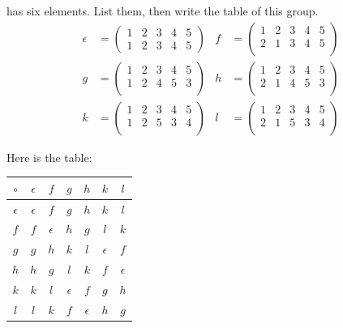\documentclass[twoside]{amsart}
\begin{document}
\begin{enumerate}[A.]
\begin{enumerate}[1]
      has six elements. List them, then write the table of this group.
      \begin{align*}
         \epsilon & = \begin{pmatrix}
	                 1 & 2 & 3 & 4 & 5 \\
			 1 & 2 & 3 & 4 & 5
		      \end{pmatrix}
		      &
         f & = \begin{pmatrix}
	          1 & 2 & 3 & 4 & 5 \\
		  2 & 1 & 3 & 4 & 5 \\
	       \end{pmatrix} \\
	 g & = \begin{pmatrix}
	          1 & 2 & 3 & 4 & 5 \\
		  1 & 2 & 4 & 5 & 3 \\
	       \end{pmatrix}
	       &
	 h & = \begin{pmatrix}
	          1 & 2 & 3 & 4 & 5 \\
		  2 & 1 & 4 & 5 & 3 \\
	       \end{pmatrix} \\
	 k & = \begin{pmatrix}
	          1 & 2 & 3 & 4 & 5 \\
		  1 & 2 & 5 & 3 & 4 \\
	       \end{pmatrix}
	       &
	 l & = \begin{pmatrix}
	          1 & 2 & 3 & 4 & 5 \\
		  2 & 1 & 5 & 3 & 4 \\
	       \end{pmatrix}
      \end{align*}

      Here is the table:
      \begin{center}
      \begin{tabular}{c|cccccc}
      $\circ$ & $\epsilon$ & $f$ & $g$ & $h$ & $k$ & $l$ \\ \hline
    $\epsilon$& $\epsilon$ & $f$ & $g$ & $h$ & $k$ & $l$ \\
          $f$ & $f$ & $\epsilon$ & $h$ & $g$ & $l$ & $k$ \\
	  $g$ & $g$ & $h$ & $k$ & $l$ & $\epsilon$ & $f$ \\
	  $h$ & $h$ & $g$ & $l$ & $k$ & $f$ & $\epsilon$ \\
	  $k$ & $k$ & $l$ & $\epsilon$ & $f$ & $g$ & $h$ \\
	  $l$ & $l$ & $k$ & $f$ & $\epsilon$ & $h$ & $g$
      \end{tabular}
      \end{center}


\end{enumerate}
\end{enumerate}
\end{document}
